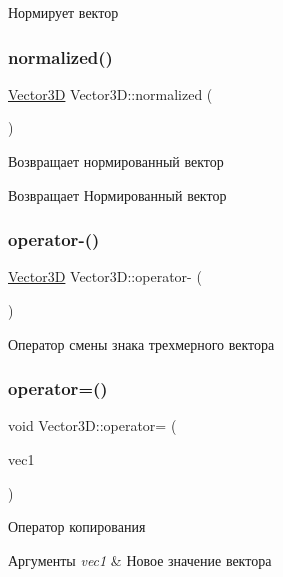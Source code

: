 Нормирует вектор \mbox{\label{class_vector3_d_af0693e0fd4ccc98bab05cc2e09916d0a}} 
\subsubsection{\texorpdfstring{normalized()}{normalized()}}
{\footnotesize\ttfamily \mbox{\hyperlink{class_vector3_d}{Vector3D}} Vector3\+D\+::normalized (\begin{DoxyParamCaption}{ }\end{DoxyParamCaption})}

Возвращает нормированный вектор \begin{DoxyReturn}{Возвращает}
Нормированный вектор 
\end{DoxyReturn}
\mbox{\label{class_vector3_d_a4b3dc84bd0535b0dabda0571928d47f0}} 
\subsubsection{\texorpdfstring{operator-\/()}{operator-()}}
{\footnotesize\ttfamily \mbox{\hyperlink{class_vector3_d}{Vector3D}} Vector3\+D\+::operator-\/ (\begin{DoxyParamCaption}{ }\end{DoxyParamCaption})}

Оператор смены знака трехмерного вектора \mbox{\label{class_vector3_d_a16ee6c0c6055de6015e06aa6987bde71}} 
\subsubsection{\texorpdfstring{operator=()}{operator=()}}
{\footnotesize\ttfamily void Vector3\+D\+::operator= (\begin{DoxyParamCaption}\item[{const \mbox{\hyperlink{class_vector3_d}{Vector3D}} \&}]{vec1 }\end{DoxyParamCaption})}

Оператор копирования 
\begin{DoxyParams}{Аргументы}
{\em vec1} & Новое значение вектора \\
\hline
\end{DoxyParams}
\mbox{\label{class_vector3_d_a9f879580bde4ca8b893df5f427c0729d}} 
